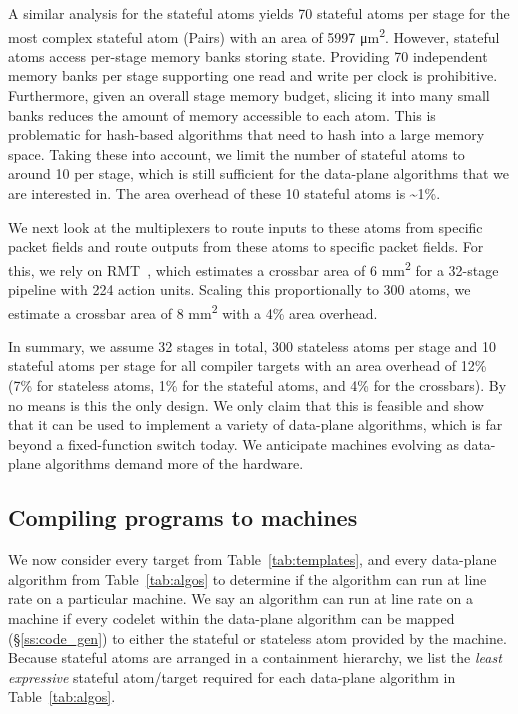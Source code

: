 A similar analysis for the stateful atoms yields 70 stateful atoms per stage for
the most complex stateful atom (Pairs) with an area of 5997 \si{\micro\metre\squared}.
However, stateful atoms access per-stage memory banks storing state.
Providing 70 independent memory banks per stage supporting one read and
write per clock is prohibitive. Furthermore, given an overall stage memory budget,
slicing it into many small banks reduces the amount of memory accessible to
each atom. This is problematic for hash-based algorithms that need to hash into
a large memory space. Taking these into account, we limit the number of
stateful atoms to around 10 per stage, which is still sufficient for the
data-plane algorithms that we are interested in. The area overhead of these 10
stateful atoms is \textasciitilde1\%.

We next look at the multiplexers to route inputs to these atoms from specific
packet fields and route outputs from these atoms to specific packet fields. For
this, we rely on RMT~\cite{rmt}, which estimates a crossbar area of 6 \si{\milli\metre\squared}
for a 32-stage pipeline with 224 action units. Scaling this proportionally to
300 atoms, we estimate a crossbar area of 8 \si{\milli\metre\squared} with a 4\% area
overhead.

In summary, we assume 32 stages in total, 300 stateless atoms per stage and 10
stateful atoms per stage for all compiler targets with an area overhead of 12\%
(7\% for stateless atoms, 1\% for the stateful atoms, and 4\% for the
crossbars). By no means is this the only design. We only claim that this is
feasible and show that it can be used to implement a variety of data-plane
algorithms, which is far beyond a fixed-function switch today. We anticipate
\absmachine machines evolving as data-plane algorithms demand more of
the hardware.

\subsection{Compiling \pktlanguage programs to \absmachine machines}
\label{ss:compiler}
We now consider every target from Table~\ref{tab:templates}, and every
data-plane algorithm from Table~\ref{tab:algos} to determine if the algorithm
can run at line rate on a particular \absmachine machine. We say an algorithm
can run at line rate on a \absmachine machine if every codelet within the
data-plane algorithm can be mapped (\S\ref{ss:code_gen}) to either the stateful
or stateless atom provided by the \absmachine machine. Because stateful atoms
are arranged in a containment hierarchy, we list the \textit{least expressive}
stateful atom/target required for each data-plane algorithm in
Table~\ref{tab:algos}.

